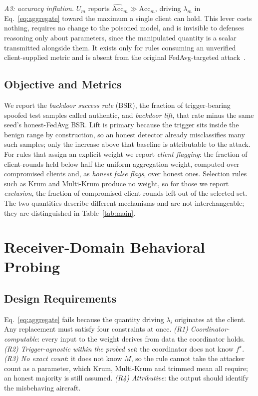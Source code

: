 \documentclass[conference]{IEEEtran}
\begin{document}
\emph{A3: accuracy inflation.} $U_m$ reports
$\widehat{\mathrm{Acc}}_m\gg\mathrm{Acc}_m$, driving $\lambda_m$ in
Eq.~\eqref{eq:aggregate} toward the maximum a single client can hold. This
lever costs nothing, requires no change to the poisoned model, and is invisible
to defenses reasoning only about parameters, since the manipulated quantity is
a scalar transmitted alongside them. It exists only for rules consuming an
unverified client-supplied metric and is absent from the original
FedAvg-targeted attack~\cite{bagdasaryan2020backdoor}.

\subsection{Objective and Metrics}

We report the
\emph{backdoor success rate} (BSR), the fraction of trigger-bearing spoofed
test samples called authentic, and \emph{backdoor lift}, that rate minus the
same seed's honest-FedAvg BSR. Lift is primary because the trigger sits inside
the benign range by construction, so an honest detector already misclassifies
many such samples; only the increase above that baseline is attributable to the
attack. For rules that assign an explicit weight we report \emph{client flagging}: the
fraction of client-rounds held below half the uniform aggregation weight,
computed over compromised clients and, as \emph{honest false flags}, over
honest ones. Selection rules such as Krum and Multi-Krum produce no weight, so
for those we report \emph{exclusion}, the fraction of compromised client-rounds
left out of the selected set. The two quantities describe different mechanisms
and are not interchangeable; they are distinguished in Table~\ref{tab:main}.

\section{Receiver-Domain Behavioral Probing}

\subsection{Design Requirements}
\label{sec:req}

Eq.~\eqref{eq:aggregate} fails because the quantity driving $\lambda_i$
originates at the client. Any replacement must satisfy four constraints at
once. \emph{(R1) Coordinator-computable}: every input to the weight derives
from data the coordinator holds. \emph{(R2) Trigger-agnostic within the probed
set}: the coordinator does not know $f^\star$. \emph{(R3) No exact count}: it
does not know $M$, so the rule cannot take the attacker count as a parameter,
which Krum, Multi-Krum and trimmed mean all require; an honest majority is
still assumed. \emph{(R4) Attributive}: the output should identify the
misbehaving aircraft.
\end{document}
